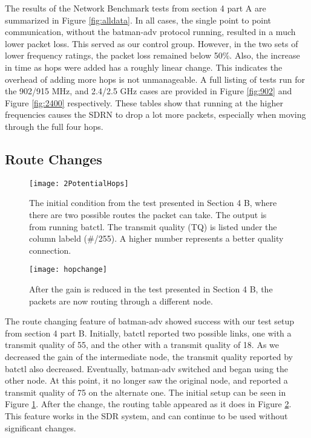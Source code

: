 The results of the Network Benchmark tests from section 4 part A are summarized in Figure \ref{fig:alldata}. In all cases, the single point to point communication, without the batman-adv protocol running, resulted in a much lower packet loss. This served as our control group. However, in the two sets of lower frequency ratings, the packet loss remained below 50\%. Also, the increase in time as hops were added has a roughly linear change. This indicates the overhead of adding more hops is not unmanageable. A full listing of tests run for the 902/915 MHz, and 2.4/2.5 GHz cases are provided in Figure \ref{fig:902} and Figure \ref{fig:2400} respectively. These tables show that running at the higher frequencies causes the SDRN to drop a lot more packets, especially when moving through the full four hops.  


\subsection{Route Changes}

\begin{figure}
	\centering
	\texttt{[image: 2PotentialHops]}
	\caption{The initial condition from the test presented in Section 4 B, where there are two possible routes the packet can take. The output is from running batctl. The transmit quality (TQ) is listed under the column labeld (\#/255). A higher number represents a better quality connection.}
	\label{fig:2Hops}
\end{figure}

\begin{figure}
	\centering
	\texttt{[image: hopchange]}
	\caption{After the gain is reduced in the test presented in Section 4 B, the packets are now routing through a different node.}
	\label{fig:NewHop}
\end{figure}

The route changing feature of batman-adv showed success with our test setup from section 4 part B. Initially, batctl reported two possible links, one with a transmit quality of 55, and the other with a transmit quality of 18. As we decreased the gain of the intermediate node, the transmit quality reported by batctl also decreased. Eventually, batman-adv switched and began using the other node. At this point, it no longer saw the original node, and reported a transmit quality of 75 on the alternate one. The initial setup can be seen in Figure \ref{fig:2Hops}. After the change, the routing table appeared as it does in Figure \ref{fig:NewHop}. This feature works in the SDR system, and can continue to be used without significant changes.

